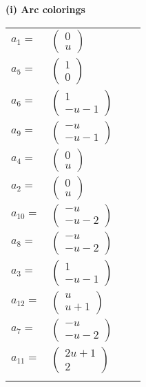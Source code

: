 \documentclass[1p]{elsarticle_modified}
\theoremstyle{definition}
\begin{document}
\flushleft \textbf{(i) Arc colorings}\\
\begin{tabular}{m{7pt} m{180pt} m{7pt} m{180pt} }
\flushright $a_{1}=$&$\begin{pmatrix}0\\u\end{pmatrix}$ \\
\flushright $a_{5}=$&$\begin{pmatrix}1\\0\end{pmatrix}$ \\
\flushright $a_{6}=$&$\begin{pmatrix}1\\- u-1\end{pmatrix}$ \\
\flushright $a_{9}=$&$\begin{pmatrix}- u\\- u-1\end{pmatrix}$ \\
\flushright $a_{4}=$&$\begin{pmatrix}0\\u\end{pmatrix}$ \\
\flushright $a_{2}=$&$\begin{pmatrix}0\\u\end{pmatrix}$ \\
\flushright $a_{10}=$&$\begin{pmatrix}- u\\- u-2\end{pmatrix}$ \\
\flushright $a_{8}=$&$\begin{pmatrix}- u\\- u-2\end{pmatrix}$ \\
\flushright $a_{3}=$&$\begin{pmatrix}1\\- u-1\end{pmatrix}$ \\
\flushright $a_{12}=$&$\begin{pmatrix}u\\u+1\end{pmatrix}$ \\
\flushright $a_{7}=$&$\begin{pmatrix}- u\\- u-2\end{pmatrix}$ \\
\flushright $a_{11}=$&$\begin{pmatrix}2 u+1\\2\end{pmatrix}$\\&\end{tabular}
\end{document}
